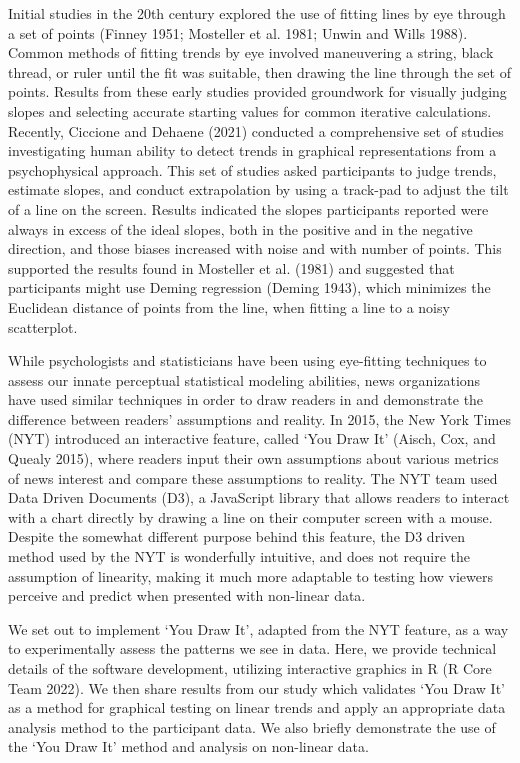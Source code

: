 \documentclass[
]{jds}
\begin{document}
Initial studies in the 20th century explored the use of fitting lines by
eye through a set of points (Finney 1951; Mosteller et al. 1981; Unwin
and Wills 1988). Common methods of fitting trends by eye involved
maneuvering a string, black thread, or ruler until the fit was suitable,
then drawing the line through the set of points. Results from these
early studies provided groundwork for visually judging slopes and
selecting accurate starting values for common iterative calculations.
Recently, Ciccione and Dehaene (2021) conducted a comprehensive set of
studies investigating human ability to detect trends in graphical
representations from a psychophysical approach. This set of studies
asked participants to judge trends, estimate slopes, and conduct
extrapolation by using a track-pad to adjust the tilt of a line on the
screen. Results indicated the slopes participants reported were always
in excess of the ideal slopes, both in the positive and in the negative
direction, and those biases increased with noise and with number of
points. This supported the results found in Mosteller et al. (1981) and
suggested that participants might use Deming regression (Deming 1943),
which minimizes the Euclidean distance of points from the line, when
fitting a line to a noisy scatterplot.

While psychologists and statisticians have been using eye-fitting
techniques to assess our innate perceptual statistical modeling
abilities, news organizations have used similar techniques in order to
draw readers in and demonstrate the difference between readers'
assumptions and reality. In 2015, the New York Times (NYT) introduced an
interactive feature, called `You Draw It' (Aisch, Cox, and Quealy 2015),
where readers input their own assumptions about various metrics of news
interest and compare these assumptions to reality. The NYT team used
Data Driven Documents (D3), a JavaScript library that allows readers to
interact with a chart directly by drawing a line on their computer
screen with a mouse. Despite the somewhat different purpose behind this
feature, the D3 driven method used by the NYT is wonderfully intuitive,
and does not require the assumption of linearity, making it much more
adaptable to testing how viewers perceive and predict when presented
with non-linear data.

We set out to implement `You Draw It', adapted from the NYT feature, as
a way to experimentally assess the patterns we see in data. Here, we
provide technical details of the software development, utilizing
interactive graphics in R (R Core Team 2022). We then share results from
our study which validates `You Draw It' as a method for graphical
testing on linear trends and apply an appropriate data analysis method
to the participant data. We also briefly demonstrate the use of the `You
Draw It' method and analysis on non-linear data.
\end{document}
